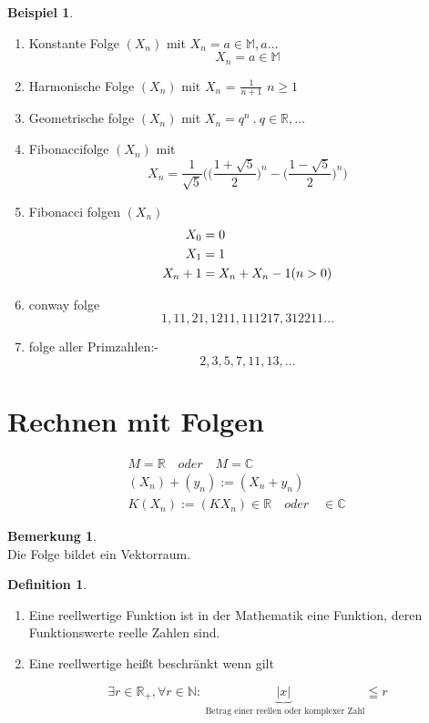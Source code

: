\documentclass[a4paper,12pt,leqno]{report}
\theoremstyle{plain} %
\theoremstyle{definition} %
\newtheorem{remark}[theorem]{Bemerkung}
\newtheorem{definition}[theorem]{Definition}
\newtheorem{example}[theorem]{Beispiel}
\begin{document}
\begin{example}
\[\]
	\begin{enumerate}
		
		\item Konstante Folge $(X_n)$ mit \quad $X_n = a \in \mathbb{M },a \dots$ \\
		\[ X_n = a \in \mathbb{M} \]
		\item Harmonische Folge $(X_n)$  mit $X_n$ =  $\frac{1}{n+1}$ \quad$ n \geq 1$
		\item Geometrische folge $(X_n)$ mit $X_n = q^n \:. \: q \in \mathbb{R}, \dots $
		\item Fibonaccifolge $(X_n)$ mit 
		\[ X_n =\frac{1}{\sqrt{5}} \Big(  \big( \frac{1+ \sqrt{5}}{2} \big)^n - \big( \frac{1- \sqrt{5}}{2}\big)^n   \Big)    \]
		
		\item Fibonacci folgen $(X_n)$ 
		\begin{align}
			X_0 &=0 \notag \\X_1 &= 1 \notag \\
			X_n+1 &= X_n+X_n-1 (n>0)  \notag
		\end{align}
		
		\item conway  folge
		\[ 1, 11 ,21 , 1211, 111217, 312211 \dots \]
		
		\item folge aller Primzahlen:- \[ 2, 3 ,5 ,7 ,11, 13 , \dots \]  
		
	\end{enumerate}
\end{example}

\section{Rechnen mit Folgen }
\begin{align*}
			M  = \mathbb{R} \quad oder \quad M = \mathbb{C} \\
			(X_n)+(y_n) := (X_n+y_n)\\
			K(X_n):=(KX_n)\in \mathbb{R} \quad  oder \quad \in  \mathbb{C}  		 		 		 		 		 		 		 		 
		\end{align*}
\begin{remark}
\[\]
Die Folge bildet ein Vektorraum. 
\end{remark}


\begin{definition}


\begin{enumerate}

\mbox{}\item Eine reellwertige Funktion ist in der Mathematik eine Funktion, deren Funktionswerte reelle Zahlen sind.

\item Eine reellwertige heißt beschränkt wenn gilt 

 \[	\exists r \in \mathbb{R}_+ , \forall r \in \mathbb{N}: \underbrace{|x|}_{\text{ Betrag einer reellen oder komplexer Zahl}} \leqq r   \]

\end{enumerate}
\end{definition}
\end{document}
